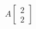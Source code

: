 \documentclass[preview]{standalone}
\begin{document}
\begin{align*}
A \begin{bmatrix} 2 \\ 2 \end{bmatrix}
\end{align*}
\end{document}
